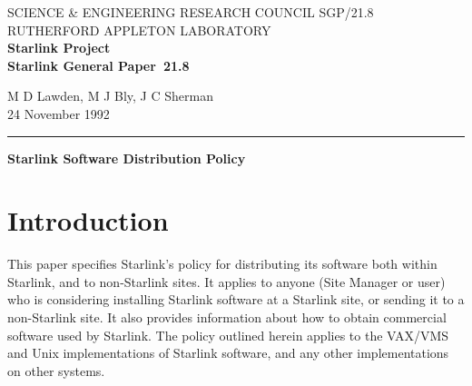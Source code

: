 \pagestyle{myheadings}

\newcommand{\stardoccategory}  {Starlink General Paper}
\newcommand{\stardocinitials}  {SGP}
\newcommand{\stardocnumber}    {21.8}
\newcommand{\stardocauthors}   {M D Lawden, M J Bly, J C Sherman}
\newcommand{\stardocdate}      {24 November 1992}
\newcommand{\stardoctitle}     {Starlink Software Distribution Policy}

\newcommand{\stardocname}{\stardocinitials /\stardocnumber}
\markright{\stardocname}
\setlength{\textwidth}{160mm}
\setlength{\textheight}{230mm}
\setlength{\topmargin}{-2mm}
\setlength{\oddsidemargin}{0mm}
\setlength{\evensidemargin}{0mm}
\setlength{\parindent}{0mm}
\setlength{\parskip}{\medskipamount}
\setlength{\unitlength}{1mm}


\thispagestyle{empty}
SCIENCE \& ENGINEERING RESEARCH COUNCIL \hfill \stardocname\\
RUTHERFORD APPLETON LABORATORY\\
{\large\bf Starlink Project\\}
{\large\bf \stardoccategory\ \stardocnumber}
\begin{flushright}
\stardocauthors\\
\stardocdate
\end{flushright}
\vspace{-4mm}
\rule{\textwidth}{0.5mm}
\vspace{5mm}
\begin{center}
{\LARGE \bf \stardoctitle}
\end{center}
\vspace{5mm}

\setlength{\parskip}{0mm}
\tableofcontents
\setlength{\parskip}{\medskipamount}
\markright{\stardocname}

\newpage

\section {Introduction}
\label{se:intro}

This paper specifies Starlink's policy for distributing its software both
within Starlink, and to non-Starlink sites. It applies to anyone (Site Manager
or user) who is considering installing Starlink software at a Starlink site, or
sending it to a non-Starlink site. It also provides information about how to
obtain commercial software used by Starlink. The policy outlined herein applies 
to the VAX/VMS and Unix implementations of Starlink software, and any other
implementations on other systems. 

